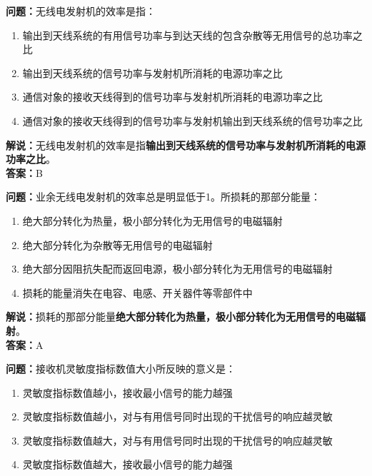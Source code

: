 \documentclass{ctexbook}
\begin{document}
\bigskip


\noindent\textbf{问题：}无线电发射机的效率是指：

\begin{enumerate}[label=\Alph*), leftmargin=3em]
	\item 输出到天线系统的有用信号功率与到达天线的包含杂散等无用信号的总功率之比
	\item 输出到天线系统的信号功率与发射机所消耗的电源功率之比
	\item 通信对象的接收天线得到的信号功率与发射机所消耗的电源功率之比
	\item 通信对象的接收天线得到的信号功率与发射机输出到天线系统的信号功率之比
\end{enumerate}

\noindent\textbf{解说：}无线电发射机的效率是指\textbf{输出到天线系统的信号功率与发射机所消耗的电源功率之比}。\\\noindent\textbf{答案：}B%


\bigskip


\noindent\textbf{问题：}业余无线电发射机的效率总是明显低于1。所损耗的那部分能量：

\begin{enumerate}[label=\Alph*), leftmargin=3em]
	\item 绝大部分转化为热量，极小部分转化为无用信号的电磁辐射
	\item 绝大部分转化为杂散等无用信号的电磁辐射
	\item 绝大部分因阻抗失配而返回电源，极小部分转化为无用信号的电磁辐射
	\item 损耗的能量消失在电容、电感、开关器件等零部件中
\end{enumerate}

\noindent\textbf{解说：}损耗的那部分能量\textbf{绝大部分转化为热量，极小部分转化为无用信号的电磁辐射}。\\\noindent\textbf{答案：}A%


\bigskip


\noindent\textbf{问题：}接收机灵敏度指标数值大小所反映的意义是：

\begin{enumerate}[label=\Alph*), leftmargin=3em]
	\item 灵敏度指标数值越小，接收最小信号的能力越强
	\item 灵敏度指标数值越小，对与有用信号同时出现的干扰信号的响应越灵敏
	\item 灵敏度指标数值越大，对与有用信号同时出现的干扰信号的响应越灵敏
	\item 灵敏度指标数值越大，接收最小信号的能力越强
\end{enumerate}
\end{document}
